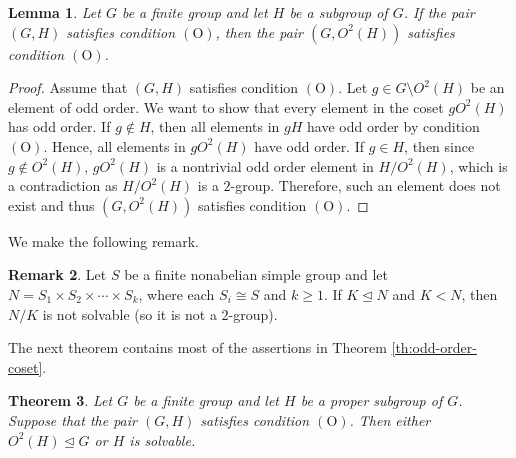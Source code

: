\documentclass[twoside,a4paper,reqno,11pt]{amsart}
\newcommand{\<}{\langle}
\renewcommand{\>}{\rangle}
\newcommand{\OO}{\mathrm {(O)}}
\renewcommand{\:}{\colon}
\newtheorem{thm}{Theorem}[section]
\newtheorem{lem}[thm]{Lemma}
\theoremstyle{definition}
\newtheorem{rem}[thm]{Remark}
\begin{document}
\begin{lem}\label{lem:subgroup}
Let $G$ be a finite group and let $H$ be a subgroup of $G$. If the pair $(G,H)$ satisfies condition $\OO$, then the pair $(G,O^2(H))$ satisfies condition $\OO$. 
 \end{lem}

\begin{proof}
Assume that $(G,H)$ satisfies condition $\OO$. Let $g\in G\setminus O^2(H)$ be an element of odd order. We want to show that every element in the coset $gO^2(H)$ has odd order. If $g\notin H$, then all elements in $gH$ have odd order by condition $\OO$. Hence, all elements in $gO^2(H)$ have odd order.  If $g\in H$, then since $g\notin O^2(H)$, $gO^2(H)$ is a nontrivial odd order element in $H/O^2(H)$, which is a contradiction as $H/O^2(H)$ is a $2$-group. Therefore, such an element does not exist and thus $(G,O^2(H))$ satisfies condition $\OO$. 
\end{proof}

We make the following remark. 

\begin{rem}\label{lem:directproduct}
Let $S$ be a finite nonabelian simple group and let $N=S_1\times S_2\times\cdots\times S_k$, where each $S_i\cong S$ and $k\ge 1.$ If $K\unlhd N$ and $K<N$, then $N/K$ is not solvable (so it is not a $2$-group).
\end{rem}



The next theorem contains most of the assertions in Theorem \ref{th:odd-order-coset}.
\begin{thm}\label{th:odd-order}
Let $G$ be a finite group and let $H$ be a proper subgroup of $G$. Suppose that the pair $(G,H)$ satisfies condition $\OO$. Then either $O^2(H)\unlhd G$ or $H$ is solvable. 
\end{thm}
\end{document}
